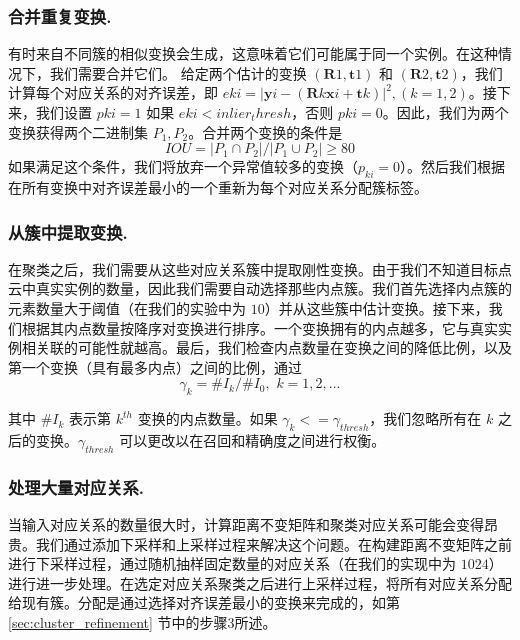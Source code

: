 \subsubsection{合并重复变换.}
有时来自不同簇的相似变换会生成，这意味着它们可能属于同一个实例。在这种情况下，我们需要合并它们。
给定两个估计的变换 $(\mathbf{R}1, \mathbf{t}1)$ 和 $(\mathbf{R}2, \mathbf{t}2)$，我们计算每个对应关系的对齐误差，即 $e{ki} = |\mathbf{y}{i}-(\mathbf{R}k \mathbf{x}{i} + \mathbf{t}k)|^2, (k = 1,2)$。接下来，我们设置 $p{ki} = 1$ 如果 $e{ki} < inlier_thresh$，否则 $p{ki}=0$。因此，我们为两个变换获得两个二进制集 $P_1, P_2$。合并两个变换的条件是
\begin{equation}
IOU = |P_1 \cap P_2|/|P_1 \cup P_2| \geq 80%
\label{eq:iou}
\end{equation}
如果满足这个条件，我们将放弃一个异常值较多的变换（$p_{ki} = 0$）。然后我们根据在所有变换中对齐误差最小的一个重新为每个对应关系分配簇标签。

\subsubsection{从簇中提取变换.}
在聚类之后，我们需要从这些对应关系簇中提取刚性变换。由于我们不知道目标点云中真实实例的数量，因此我们需要自动选择那些内点簇。我们首先选择内点簇的元素数量大于阈值（在我们的实验中为 $10$）并从这些簇中估计变换。接下来，我们根据其内点数量按降序对变换进行排序。一个变换拥有的内点越多，它与真实实例相关联的可能性就越高。最后，我们检查内点数量在变换之间的降低比例，以及第一个变换（具有最多内点）之间的比例，通过
\begin{equation}
    \gamma_k = \#I_{k}/\#I_{0},\,\, k = 1,2,\ldots
\end{equation}

其中 $\#I_k$ 表示第 $k^{th}$ 变换的内点数量。如果 $\gamma_k <= \gamma_{thresh}$，我们忽略所有在 $k$ 之后的变换。$\gamma_{thresh}$ 可以更改以在召回和精确度之间进行权衡。

\subsubsection{处理大量对应关系.}
当输入对应关系的数量很大时，计算距离不变矩阵和聚类对应关系可能会变得昂贵。我们通过添加下采样和上采样过程来解决这个问题。在构建距离不变矩阵之前进行下采样过程，通过随机抽样固定数量的对应关系（在我们的实现中为 $1024$）进行进一步处理。在选定对应关系聚类之后进行上采样过程，将所有对应关系分配给现有簇。分配是通过选择对齐误差最小的变换来完成的，如第 \ref{sec:cluster_refinement} 节中的步骤3所述。

